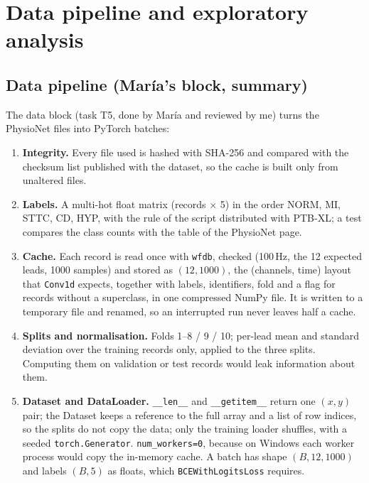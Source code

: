 \section{Data pipeline and exploratory analysis}\label{sec:data-code}

\subsection{Data pipeline (Mar\'ia's block, summary)}

The data block (task T5, done by Mar\'ia and reviewed by me) turns the PhysioNet files into PyTorch
batches:
\begin{enumerate}[leftmargin=1.4em,itemsep=1pt]
  \item \textbf{Integrity.} Every file used is hashed with SHA-256 and compared with the checksum list
        published with the dataset, so the cache is built only from unaltered files.
  \item \textbf{Labels.} A multi-hot float matrix (records $\times$ 5) in the order NORM, MI, STTC, CD,
        HYP, with the rule of the script distributed with PTB-XL; a test compares the class counts with
        the table of the PhysioNet page.
  \item \textbf{Cache.} Each record is read once with \texttt{wfdb}, checked (100\,Hz, the 12 expected
        leads, 1000 samples) and stored as $(12, 1000)$, the (channels, time) layout that
        \texttt{Conv1d} expects, together with labels, identifiers, fold and a flag for records without a
        superclass, in one compressed NumPy file. It is written to a temporary file and renamed, so an
        interrupted run never leaves half a cache.
  \item \textbf{Splits and normalisation.} Folds 1--8 / 9 / 10; per-lead mean and standard deviation
        over the training records only, applied to the three splits. Computing them on validation or test
        records would leak information about them.
  \item \textbf{Dataset and DataLoader.} \texttt{\_\_len\_\_} and \texttt{\_\_getitem\_\_} return one
        $(x, y)$ pair; the Dataset keeps a reference to the full array and a list of row indices, so the
        splits do not copy the data; only the training loader shuffles, with a seeded
        \texttt{torch.Generator}. \texttt{num\_workers=0}, because on Windows each worker process would
        copy the in-memory cache. A batch has shape $(B, 12, 1000)$ and labels $(B, 5)$ as floats, which
        \texttt{BCEWithLogitsLoss} requires.
\end{enumerate}

